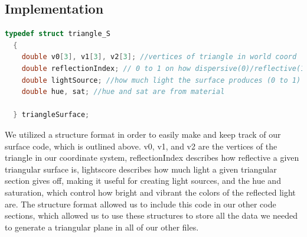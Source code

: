 \documentclass{article}
\begin{document}
\subsection{Implementation}
\begin{lstlisting}[language = C]
  typedef struct triangle_S
  {
    double v0[3], v1[3], v2[3]; //vertices of triangle in world coord
    double reflectionIndex; // 0 to 1 on how dispersive(0)/reflective(1) surface is
    double lightSource; //how much light the surface produces (0 to 1)
    double hue, sat; //hue and sat are from material
    
  } triangleSurface;
\end{lstlisting}
We utilized a structure format in order to easily make and keep track of our surface code, which is outlined above.
v0, v1, and v2 are the vertices of the triangle in our coordinate system, reflectionIndex describes how reflective
a given triangular surface is, lightscore describes how much light a given triangular section gives off, making
it useful for creating light sources, and the hue and saturation, which control how bright and vibrant the colors of
the reflected light are. The structure format  allowed us to include this code in our other code sections, which
allowed us to use these structures to store all the data we needed to generate a triangular plane in all of our
other files.
\end{document}
